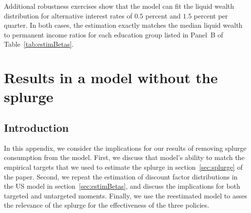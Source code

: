 \documentclass[\PathToRoot/\ProjectName]{subfiles}
\begin{document}

\whenstandalone{%
  \setcounter{section}{0}  %
}

Additional robustness exercises show that the model can fit the liquid wealth distribution for alternative interest rates of $0.5$ percent and $1.5$ percent per quarter. In both cases, the estimation exactly matches the median liquid wealth to permanent income ratios for each education group listed in Panel~B of Table~\ref{tab:estimBetas}.
\section{Results in a model without the splurge}
\whenintegrated{\label{app:Model-without-splurge}} 

\subsection{Introduction}
\whenintegrated{\label{app:Model-without-splurge-intro}} 

In this appendix, we consider the implications for our results of removing splurge consumption from the model. First, we discuss that model's ability to match the empirical targets that we used to estimate the splurge in section~\ref{sec:splurge} of the paper. Second, we repeat the estimation of discount factor distributions in the US model in section~\ref{sec:estimBetas}, and discuss the implications for both targeted and untargeted moments. Finally, we use the reestimated model to asses the relevance of the splurge for the effectiveness of the three policies.
\end{document}

